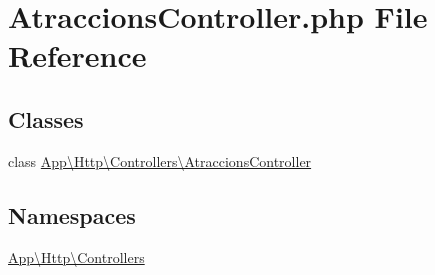 \hypertarget{_atraccions_controller_8php}{}\section{Atraccions\+Controller.\+php File Reference}
\label{_atraccions_controller_8php}
\subsection*{Classes}
\begin{DoxyCompactItemize}
\item 
class \mbox{\hyperlink{class_app_1_1_http_1_1_controllers_1_1_atraccions_controller}{App\textbackslash{}\+Http\textbackslash{}\+Controllers\textbackslash{}\+Atraccions\+Controller}}
\end{DoxyCompactItemize}
\subsection*{Namespaces}
\begin{DoxyCompactItemize}
\item 
 \mbox{\hyperlink{namespace_app_1_1_http_1_1_controllers}{App\textbackslash{}\+Http\textbackslash{}\+Controllers}}
\end{DoxyCompactItemize}

